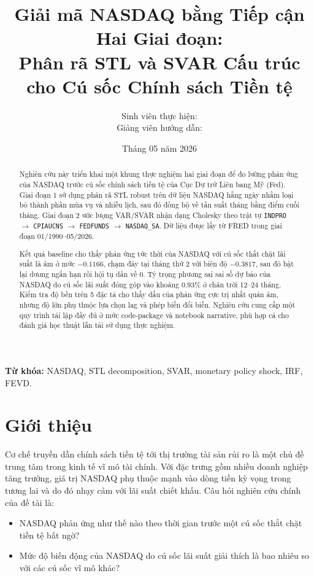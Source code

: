 \documentclass[12pt,a4paper]{article}
\title{\textbf{Giải mã NASDAQ bằng Tiếp cận Hai Giai đoạn:\\
Phân rã STL và SVAR Cấu trúc cho Cú sốc Chính sách Tiền tệ}}
\author{Sinh viên thực hiện: \underline{\hspace{5cm}}\\
Giảng viên hướng dẫn: \underline{\hspace{5cm}}}
\date{Tháng 05 năm 2026}
\begin{document}
\maketitle
\thispagestyle{empty}
\newpage

\begin{abstract}
Nghiên cứu này triển khai một khung thực nghiệm hai giai đoạn để đo lường phản ứng của NASDAQ trước cú sốc chính sách tiền tệ của Cục Dự trữ Liên bang Mỹ (Fed). Giai đoạn 1 sử dụng phân rã STL robust trên dữ liệu NASDAQ hằng ngày nhằm loại bỏ thành phần mùa vụ và nhiễu lịch, sau đó đồng bộ về tần suất tháng bằng điểm cuối tháng. Giai đoạn 2 ước lượng VAR/SVAR nhận dạng Cholesky theo trật tự \texttt{INDPRO} $\rightarrow$ \texttt{CPIAUCNS} $\rightarrow$ \texttt{FEDFUNDS} $\rightarrow$ \texttt{NASDAQ\_SA}. Dữ liệu được lấy từ FRED trong giai đoạn 01/1990--05/2026.

Kết quả baseline cho thấy phản ứng tức thời của NASDAQ với cú sốc thắt chặt lãi suất là âm ở mức \(-0.1166\), chạm đáy tại tháng thứ 2 với biên độ \(-0.3817\), sau đó bật lại dương ngắn hạn rồi hội tụ dần về 0. Tỷ trọng phương sai sai số dự báo của NASDAQ do cú sốc lãi suất đóng góp vào khoảng \(0.93\%\) ở chân trời 12--24 tháng. Kiểm tra độ bền trên 5 đặc tả cho thấy dấu của phản ứng cực trị nhất quán âm, nhưng độ lớn phụ thuộc lựa chọn lag và phép biến đổi biến. Nghiên cứu cung cấp một quy trình tái lập đầy đủ ở mức code-package và notebook narrative, phù hợp cả cho đánh giá học thuật lẫn tái sử dụng thực nghiệm.
\end{abstract}

\textbf{Từ khóa:} NASDAQ, STL decomposition, SVAR, monetary policy shock, IRF, FEVD.

\newpage
\tableofcontents
\newpage
\listoffigures
\newpage
\listoftables
\newpage

\section{Giới thiệu}

Cơ chế truyền dẫn chính sách tiền tệ tới thị trường tài sản rủi ro là một chủ đề trung tâm trong kinh tế vĩ mô tài chính. Với đặc trưng gồm nhiều doanh nghiệp tăng trưởng, giá trị NASDAQ phụ thuộc mạnh vào dòng tiền kỳ vọng trong tương lai và do đó nhạy cảm với lãi suất chiết khấu. Câu hỏi nghiên cứu chính của đề tài là:

\begin{itemize}[leftmargin=1.5em]
    \item NASDAQ phản ứng như thế nào theo thời gian trước một cú sốc thắt chặt tiền tệ bất ngờ?
    \item Mức độ biến động của NASDAQ do cú sốc lãi suất giải thích là bao nhiêu so với các cú sốc vĩ mô khác?
\end{itemize}
\end{document}
